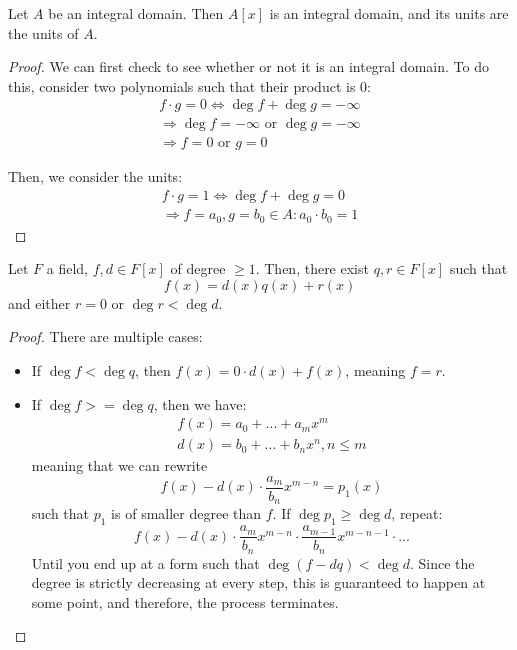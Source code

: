 \begin{theorem*}
  Let $A$ be an integral domain. Then $A[x]$ is an integral domain, and its units are the units of $A$. 
\end{theorem*}
\begin{proof}
  We can first check to see whether or not it is an integral domain. To do this, consider two polynomials such that their product is 0: 
  \begin{gather*}
    f \cdot g = 0 \Leftrightarrow \deg f + \deg g = -\infty \\
    \Rightarrow \deg f = -\infty \text{ or } \deg g = -\infty \\
    \Rightarrow f = 0 \text{ or } g = 0
  \end{gather*}
  
  Then, we consider the units: 
  \begin{gather*}
    f \cdot g = 1 \Leftrightarrow \deg f + \deg g = 0 \\
    \Rightarrow f = a_0, g = b_0 \in A : a_0 \cdot b_0 = 1
  \end{gather*}
\end{proof}


\begin{theorem}
  Let $F$ a field, $f, d \in F[x]$ of degree $\geqslant 1$. Then, there exist $q, r \in F[x]$ such that 
  \[
    f(x) = d(x)q(x) + r(x)
  \]
  and either $r = 0$ or $\deg r < \deg d$. 
\end{theorem}
\begin{proof}
  There are multiple cases: 
  \begin{itemize}
    \item If $\deg f < \deg q$, then $f(x) = 0 \cdot d(x) + f(x)$, meaning $f = r$. 
    \item If $\deg f >= \deg q$, then we have: 
    \begin{gather*}
      f(x) = a_0 + ... + a_mx^m \\
      d(x) = b_0 + ... + b_nx^n, n \leqslant m
    \end{gather*}
    meaning that we can rewrite
    \[
      f(x) - d(x) \cdot \frac{a_m}{b_n}x^{m-n} = p_1(x)
    \]
    such that $p_1$ is of smaller degree than $f$. If $\deg p_1 \geqslant \deg d$, repeat: 
    \[
      f(x) - d(x) \cdot \frac{a_m}{b_n}x^{m-n} \cdot \frac{a_{m - 1}}{b_n}x^{m-n-1} \cdot ...
    \]
    Until you end up at a form such that $\deg (f - dq) < \deg d$. Since the degree is strictly decreasing at every step, this is guaranteed to happen at some point, and therefore, the process terminates.
  \end{itemize}
\end{proof}

